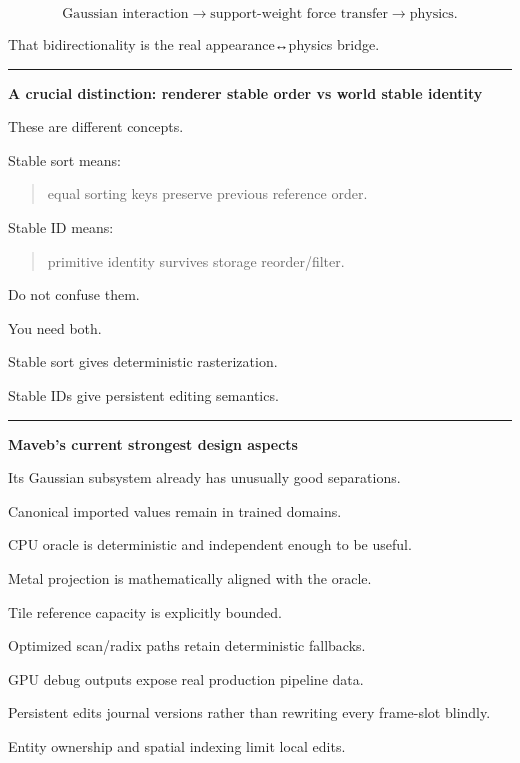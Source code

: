 \[
\text{Gaussian interaction}
\rightarrow
\text{support-weight force transfer}
\rightarrow
\text{physics}.
\]

That bidirectionality is the real appearance↔physics bridge.

\begin{center}\rule{0.5\linewidth}{0.5pt}\end{center}

\textbf{A crucial distinction: renderer stable order vs world stable identity}

These are different concepts.

Stable sort means:

\begin{quote}
equal sorting keys preserve previous reference order.
\end{quote}

Stable ID means:

\begin{quote}
primitive identity survives storage reorder/filter.
\end{quote}

Do not confuse them.

You need both.

Stable sort gives deterministic rasterization.

Stable IDs give persistent editing semantics.

\begin{center}\rule{0.5\linewidth}{0.5pt}\end{center}

\textbf{Maveb's current strongest design aspects}

Its Gaussian subsystem already has unusually good separations.

Canonical imported values remain in trained domains.

CPU oracle is deterministic and independent enough to be useful.

Metal projection is mathematically aligned with the oracle.

Tile reference capacity is explicitly bounded.

Optimized scan/radix paths retain deterministic fallbacks.

GPU debug outputs expose real production pipeline data.

Persistent edits journal versions rather than rewriting every frame-slot blindly.

Entity ownership and spatial indexing limit local edits.

